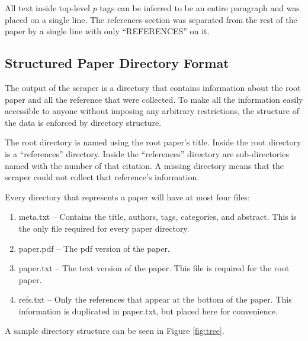 \documentclass[10pt, conference, compsocconf]{IEEEtran}
\begin{document}
All text inside top-level $p$ tags can be inferred to be an entire paragraph and was placed on a single line.
The references section was separated from the rest of the paper by a single line with only ``REFERENCES'' on it.

\subsection{Structured Paper Directory Format}\label{sec:paperFormat}
The output of the scraper is a directory that contains information about the root paper and all the reference that were collected.
To make all the information easily accessible to anyone without imposing any arbitrary restrictions, the structure of the
data is enforced by directory structure.

The root directory is named using the root paper's title. Inside the root directory is a ``references'' directory.
Inside the ``references'' directory are sub-directories named with the number of that citation. A missing directory
means that the scraper could not collect that reference's information.

Every directory that represents a paper will have at most four files:
\begin{enumerate}
   \item meta.txt -- Contains the title, authors, tags, categories, and abstract. This is the only file required for every paper directory.
   \item paper.pdf -- The pdf version of the paper.
   \item paper.txt -- The text version of the paper. This file is required for the root paper.
   \item refs.txt -- Only the references that appear at the bottom of the paper. This information is duplicated in paper.txt, but placed here for convenience.
\end{enumerate}

A sample directory structure can be seen in Figure \ref{fig:tree}.
\end{document}
